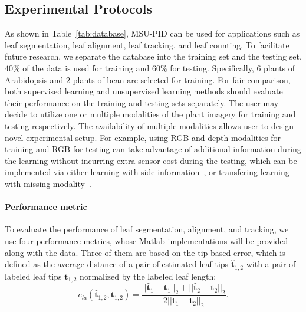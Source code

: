 \subsection{Experimental Protocols}
As shown in Table~\ref{tab:database}, MSU-PID can be used for applications such as leaf segmentation, leaf alignment, leaf tracking, and leaf counting.
To facilitate future research, we separate the database into the training set and the testing set.
$40\%$ of the data is used for training and $60\%$ for testing.
Specifically, $6$ plants of Arabidopsis and $2$ plants of bean are selected for training.
For fair comparison, both supervised learning and unsupervised learning methods should evaluate their performance on the training and testing sets separately.
The user may decide to utilize one or multiple modalities of the plant imagery for training and testing respectively.
The availability of multiple modalities allows user to design novel experimental setup.
For example, using RGB and depth modalities for training and RGB for testing can take advantage of additional information during the learning without incurring extra sensor cost during the testing, which can be implemented via either learning with side information~\cite{chen2013boosting}, or transfering learning with missing modality~\cite{ding2014latent}.


\paragraph{Performance metric}
To evaluate the performance of leaf segmentation, alignment, and tracking, we use four performance metrics, whose Matlab implementations will be provided along with the data.
Three of them are based on the tip-based error, which is defined as the average distance of a pair of estimated leaf tips $\hat{\bm{t}}_{1,2}$ with a pair of labeled leaf tips $ \bm{t}_{1,2}$ normalized by the labeled leaf length:
\begin {equation}
e_{la}(\hat{\bm{t}}_{1,2}, \bm{t}_{1,2}) = \frac{||\hat{\bm{t}}_1-{\bm{t}}_1||_2 + ||\hat{\bm{t}}_2-{\bm{t}}_2||_2}{2 ||\bm{t}_1-\bm{t}_2||_2}.
\label{eqn:tipError}
\end{equation}


